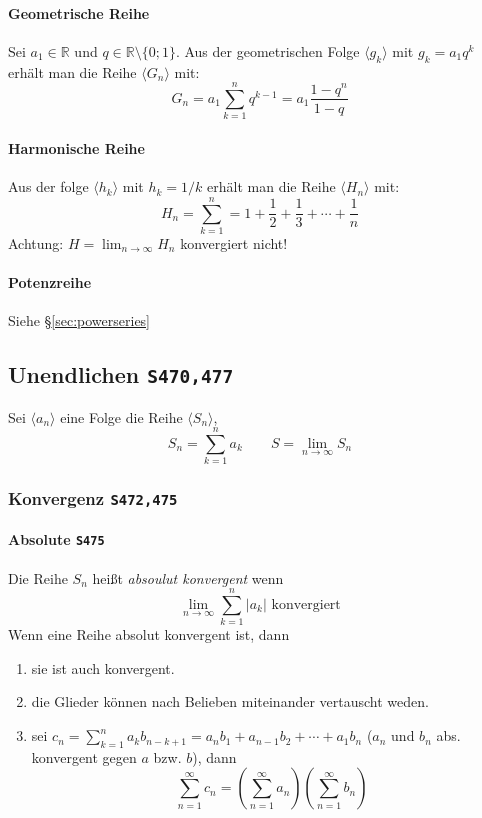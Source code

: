 \documentclass[margin=small, twocolumn]{hsrzf}
\numberwithin{equation}{subsection}
\newcommand{\brpage}[1]{\textcolor{red!70!black}{\small\texttt{S#1}}}
\begin{document}
\paragraph{Geometrische Reihe}
Sei \(a_1 \in \mathbb{R}\) und \(q \in \mathbb{R} \setminus \{0;1\}\). Aus der geometrischen Folge \(\langle g_k \rangle\) mit \(g_k = a_1 q^k\) erh\"alt man die Reihe \(\langle G_n \rangle\) mit:
\[
    G_n = a_1 \sum_{k=1}^n q^{k-1} = a_1 \frac{1-q^n}{1-q}
\]

\paragraph{Harmonische Reihe}
Aus der folge \(\langle h_k \rangle\) mit \(h_k = 1/k\) erh\"alt man die Reihe \(\langle H_n \rangle\) mit:
\[
    H_n = \sum_{k=1}^n = 1 + \frac{1}{2} + \frac{1}{3} + \cdots + \frac{1}{n}
\]
Achtung: \(H = \lim_{n\to\infty} H_n\) konvergiert nicht!

\paragraph{Potenzreihe} Siehe \S\ref{sec:powerseries}

\subsection{Unendlichen \brpage{470,477}}
Sei \(\langle a_n \rangle\) eine Folge die Reihe \(\langle S_n \rangle\),
\[
    S_n = \sum_{k=1}^n a_k \qquad S = \lim_{n\to\infty} S_n
\]

\subsubsection{Konvergenz \brpage{472,475}}

\paragraph{Absolute \brpage{475}}
Die Reihe \(S_n\) hei{\ss}t \emph{absoulut konvergent} wenn
\[
    \lim_{n\to\infty} \sum_{k=1}^n \left| a_k \right| \text{ konvergiert}
\]
Wenn eine Reihe absolut konvergent ist, dann
\begin{enumerate}
    \item sie ist auch konvergent.
    \item die Glieder k\"onnen nach Belieben miteinander vertauscht weden.
    \item sei \(\displaystyle 
        c_n = \sum_{k=1}^n a_k b_{n-k+1} = a_n b_1 + a_{n-1} b_2 + \cdots + a_1 b_n
    \) (\(a_n\) und \(b_n\) abs. konvergent gegen \(a\) bzw. \(b\)), dann
    \[
        \sum_{n=1}^\infty c_n = 
        \left(\sum_{n=1}^\infty a_n\right)
        \left(\sum_{n=1}^\infty b_n\right)
    \]
\end{enumerate}
\end{document}
